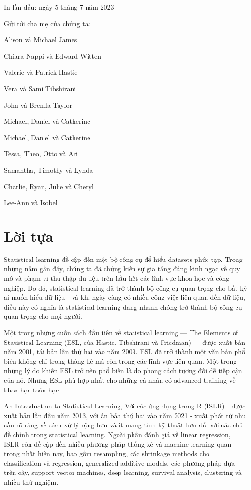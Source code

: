 In lần đầu: ngày 5 tháng 7 năm 2023

Gửi tới cha mẹ của chúng ta:

Alison và Michael James

Chiara Nappi và Edward Witten

Valerie và Patrick Hastie

Vera và Sami Tibshirani

John và Brenda Taylor

Michael, Daniel và Catherine

Michael, Daniel và Catherine

Tessa, Theo, Otto và Ari

Samantha, Timothy và Lynda

Charlie, Ryan, Julie và Cheryl

Lee-Ann và Isobel

\section{Lời tựa}

Statistical learning đề cập đến một bộ công cụ để hiểu datasets phức tạp. Trong những năm gần đây, chúng ta đã chứng kiến ​​sự gia tăng đáng kinh ngạc về quy mô và phạm vi thu thập dữ liệu trên hầu hết các lĩnh vực khoa học và công nghiệp. Do đó, statistical learning đã trở thành bộ công cụ quan trọng cho bất kỳ ai muốn hiểu dữ liệu - và khi ngày càng có nhiều công việc liên quan đến dữ liệu, điều này có nghĩa là statistical learning đang nhanh chóng trở thành bộ công cụ quan trọng cho mọi người.

Một trong những cuốn sách đầu tiên về statistical learning — The Elements of Statistical Learning (ESL, của Hastie, Tibshirani và Friedman) — được xuất bản năm 2001, tái bản lần thứ hai vào năm 2009. ESL đã trở thành một văn bản phổ biến không chỉ trong thống kê mà còn trong các lĩnh vực liên quan. Một trong những lý do khiến ESL trở nên phổ biến là do phong cách tương đối dễ tiếp cận của nó. Nhưng ESL phù hợp nhất cho những cá nhân có advanced training về khoa học toán học.

An Introduction to Statistical Learning, Với các ứng dụng trong R (ISLR) - được xuất bản lần đầu năm 2013, với ấn bản thứ hai vào năm 2021 - xuất phát từ nhu cầu rõ ràng về cách xử lý rộng hơn và ít mang tính kỹ thuật hơn đối với các chủ đề chính trong statistical learning. Ngoài phần đánh giá về linear regression, ISLR còn đề cập đến nhiều phương pháp thống kê và machine learning quan trọng nhất hiện nay, bao gồm resampling, các shrinkage methods cho classification và regression, generalized additive models, các phương pháp dựa trên cây, support vector machines, deep learning, survival analysis, clustering và nhiều thử nghiệm.

